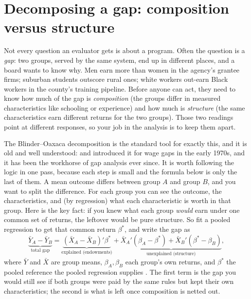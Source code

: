\documentclass[
    a4paper,
    fontsize=10pt,
    twoside=true,
    numbers=noenddot,
]{kaobook}
\begin{document}
\section{Decomposing a gap: composition versus structure}\label{sec:oaxaca}
Not every question an evaluator gets is about a program. Often the question is a \emph{gap}: two groups, served by the same system, end up in different places, and a board wants to know why. Men earn more than women in the agency's grantee firms; suburban students outscore rural ones; white workers out-earn Black workers in the county's training pipeline. Before anyone can act, they need to know how much of the gap is \emph{composition} (the groups differ in measured characteristics like schooling or experience) and how much is \emph{structure} (the same characteristics earn different returns for the two groups). Those two readings point at different responses, so your job in the analysis is to keep them apart.

The Blinder--Oaxaca decomposition is the standard tool for exactly this, and it is old and well understood: \textcite{blinder1973wage} and \textcite{oaxaca1973male} introduced it for wage gaps in the early 1970s, and it has been the workhorse of gap analysis ever since. It is worth following the logic in one pass, because each step is small and the formula below is only the last of them. A mean outcome differs between group $A$ and group $B$, and you want to split the difference. For each group you can see the outcome, the characteristics, and (by regression) what each characteristic is worth in that group. Here is the key fact: if you knew what each group \emph{would} earn under one common set of returns, the leftover would be pure structure. So fit a pooled regression to get that common return $\beta^\ast$, and write the gap as
\[
\underbrace{\bar Y_A-\bar Y_B}_{\text{total gap}}
=\underbrace{(\bar X_A-\bar X_B)'\beta^\ast}_{\text{explained (endowments)}}
+\underbrace{\bar X_A'(\beta_A-\beta^\ast)+\bar X_B'(\beta^\ast-\beta_B)}_{\text{unexplained (structure)}},
\]
where $\bar Y$ and $\bar X$ are group means, $\beta_A,\beta_B$ each group's own returns, and $\beta^\ast$ the pooled reference the pooled regression supplies \parencite{jann2008oaxaca}. The first term is the gap you would still see if both groups were paid by the same rules but kept their own characteristics; the second is what is left once composition is netted out.
\end{document}
